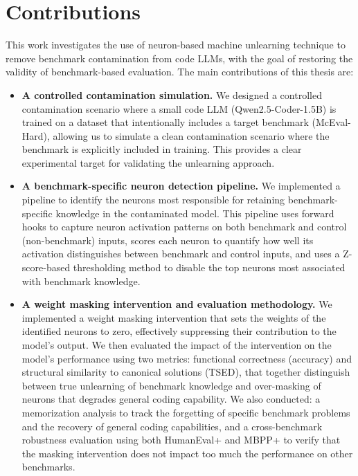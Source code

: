 \documentclass[mscthesis]{usiinfthesis}
\begin{document}
\section{Contributions}
This work investigates the use of neuron-based machine unlearning technique to remove benchmark contamination from code LLMs, with the goal of restoring the validity of benchmark-based evaluation.
The main contributions of this thesis are:
\begin{itemize}
	\item \textbf{A controlled contamination simulation.} We designed a controlled contamination scenario where a small code LLM (Qwen2.5-Coder-1.5B) is trained on a dataset that intentionally includes a target benchmark (McEval-Hard), allowing us to simulate a clean contamination scenario where the benchmark is explicitly included in training. This provides a clear experimental target for validating the unlearning approach.
	\item \textbf{A benchmark-specific neuron detection pipeline.} We implemented a pipeline to identify the neurons most responsible for retaining benchmark-specific knowledge in the contaminated model. This pipeline uses forward hooks to capture neuron activation patterns on both benchmark and control (non-benchmark) inputs, scores each neuron to quantify how well its activation distinguishes between benchmark and control inputs, and uses a Z-score-based thresholding method to disable the top neurons most associated with benchmark knowledge. %
	\item \textbf{A weight masking intervention and evaluation methodology.} We implemented a weight masking intervention that sets the weights of the identified neurons to zero, effectively suppressing their contribution to the model's output. We then evaluated the impact of the intervention on the model's performance using two metrics: functional correctness (accuracy) and structural similarity to canonical solutions (TSED), that together distinguish between true unlearning of benchmark knowledge and over-masking of neurons that degrades general coding capability. We also conducted: a memorization analysis to track the forgetting of specific benchmark problems and the recovery of general coding capabilities, and a cross-benchmark robustness evaluation using both HumanEval+ and MBPP+ to verify that the masking intervention does not impact too much the performance on other benchmarks.
\end{itemize}
\end{document}

